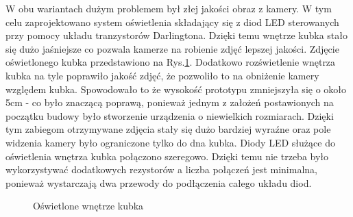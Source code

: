 W obu wariantach dużym problemem był złej jakości obraz z kamery. W tym celu zaprojektowano system oświetlenia składający się z diod
LED sterowanych przy pomocy układu tranzystorów Darlingtona. Dzięki temu wnętrze kubka stało się dużo jaśniejsze co pozwala kamerze na
robienie zdjęć lepszej jakości. Zdjęcie oświetlonego kubka przedstawiono na Rys.\ref{fig:jasno}. Dodatkowo rozświetlenie wnętrza kubka na tyle poprawiło
jakość zdjęć, że pozwoliło to na obniżenie kamery względem kubka. Spowodowało to że wysokość prototypu zmniejszyła się o około 5cm - 
co było znaczącą poprawą, ponieważ jednym z założeń postawionych na początku budowy było stworzenie urządzenia o niewielkich rozmiarach.
Dzięki tym zabiegom otrzymywane zdjęcia stały się dużo bardziej wyraźne oraz pole widzenia kamery było ograniczone tylko do dna kubka.
Diody LED służące do oświetlenia wnętrza kubka połączono szeregowo. Dzięki temu nie trzeba było wykorzystywać dodatkowych rezystorów a liczba połączeń
jest minimalna, ponieważ wystarczają dwa przewody do podłączenia całego układu diod.

\begin{figure}[H]
    \centering
    \caption{\label{fig:jasno}Oświetlone wnętrze kubka}
\end{figure}

